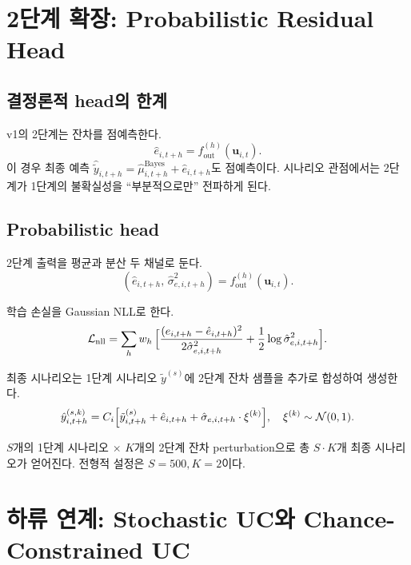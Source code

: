 \documentclass[11pt,a4paper]{article}
\begin{document}
\section{2단계 확장: Probabilistic Residual Head}

\subsection{결정론적 head의 한계}

v1의 2단계는 잔차를 점예측한다.
\begin{equation}
    \hat e_{i,t+h} = f_{\mathrm{out}}^{(h)}(\bm u_{i,t}).
\end{equation}
이 경우 최종 예측 $\hat{\tilde y}_{i,t+h} = \hat\mu^{\mathrm{Bayes}}_{i,t+h} + \hat e_{i,t+h}$도 점예측이다. 시나리오 관점에서는 2단계가 1단계의 불확실성을 ``부분적으로만'' 전파하게 된다.

\subsection{Probabilistic head}

2단계 출력을 평균과 분산 두 채널로 둔다.
\begin{equation}
    (\hat e_{i,t+h},\,\hat\sigma_{e,i,t+h}^2) = f_{\mathrm{out}}^{(h)}(\bm u_{i,t}).
\end{equation}

학습 손실을 Gaussian NLL로 한다.
\begin{equation}
    \mathcal{L}_{\mathrm{nll}} = \sum_h w_h\,\Bigl[\frac{(e_{i,t+h}-\hat e_{i,t+h})^2}{2\hat\sigma_{e,i,t+h}^2} + \frac{1}{2}\log\hat\sigma_{e,i,t+h}^2\Bigr].
\end{equation}

최종 시나리오는 1단계 시나리오 $\tilde y^{(s)}$에 2단계 잔차 샘플을 추가로 합성하여 생성한다.
\begin{equation}
    \hat y^{(s,k)}_{i,t+h} = C_i\Bigl[\tilde y^{(s)}_{i,t+h} + \hat e_{i,t+h} + \hat\sigma_{e,i,t+h}\cdot\xi^{(k)}\Bigr],\quad \xi^{(k)}\sim\mathcal{N}(0,1).
\end{equation}

$S$개의 1단계 시나리오 $\times$ $K$개의 2단계 잔차 perturbation으로 총 $S\cdot K$개 최종 시나리오가 얻어진다. 전형적 설정은 $S=500, K=2$이다.

\section{하류 연계: Stochastic UC와 Chance-Constrained UC}
\end{document}
